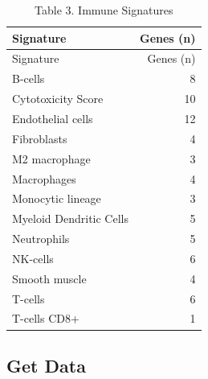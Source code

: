 \documentclass[
]{article}
\newenvironment{Shaded}{\begin{snugshade}}{\end{snugshade}}
\newcommand{\AttributeTok}[1]{\textcolor[rgb]{0.13,0.29,0.53}{#1}}
\newcommand{\FunctionTok}[1]{\textcolor[rgb]{0.13,0.29,0.53}{\textbf{#1}}}
\newcommand{\NormalTok}[1]{#1}
\newcommand{\SpecialCharTok}[1]{\textcolor[rgb]{0.81,0.36,0.00}{\textbf{#1}}}
\newcommand{\StringTok}[1]{\textcolor[rgb]{0.31,0.60,0.02}{#1}}
\begin{document}
\begin{Shaded}
\end{Shaded}

\begin{longtable}[]{@{}lr@{}}
\caption{Table 3. Immune Signatures}\tabularnewline
\toprule\noalign{}
Signature & Genes (n) \\
\midrule\noalign{}
\endfirsthead
\toprule\noalign{}
Signature & Genes (n) \\
\midrule\noalign{}
\endhead
\bottomrule\noalign{}
\endlastfoot
B-cells & 8 \\
Cytotoxicity Score & 10 \\
Endothelial cells & 12 \\
Fibroblasts & 4 \\
M2 macrophage & 3 \\
Macrophages & 4 \\
Monocytic lineage & 3 \\
Myeloid Dendritic Cells & 5 \\
Neutrophils & 5 \\
NK-cells & 6 \\
Smooth muscle & 4 \\
T-cells & 6 \\
T-cells CD8+ & 1 \\
\end{longtable}

\subsection{Get Data}\label{get-data}
\end{document}
